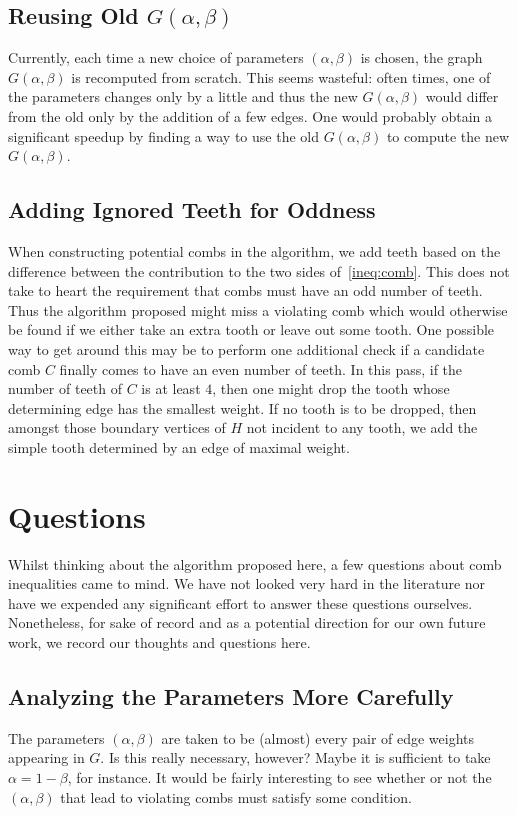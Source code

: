\documentclass[11pt, letterpaper]{amsart}
\theoremstyle{plain}
\theoremstyle{definition}
\theoremstyle{remark}
\begin{document}
\subsection{Reusing Old $G(\alpha,\beta)$}
Currently, each time a new choice of parameters $(\alpha,\beta)$ is chosen, the
graph $G(\alpha,\beta)$ is recomputed from scratch. This seems wasteful: often times,
one of the parameters changes only by a little and thus the new $G(\alpha,\beta)$
would differ from the old only by the addition of a few edges. One would probably
obtain a significant speedup by finding a way to use the old $G(\alpha,\beta)$
to compute the new $G(\alpha,\beta)$.

\subsection{Adding Ignored Teeth for Oddness}
When constructing potential combs in the algorithm, we add teeth based on the
difference between the contribution to the two sides of~\eqref{ineq:comb}. This
does not take to heart the requirement that combs must have an odd number of
teeth.  Thus the algorithm proposed might miss a violating comb which would
otherwise be found if we either take an extra tooth or leave out some tooth.
One possible way to get around this may be to perform one additional check if a
candidate comb $C$ finally comes to have an even number of teeth. In this pass,
if the number of teeth of $C$ is at least $4$, then one might drop the tooth
whose determining edge has the smallest weight. If no tooth is to be dropped,
then amongst those boundary vertices of $H$ not incident to any tooth, we add
the simple tooth determined by an edge of maximal weight.

\section{Questions}\label{sec:questions}
Whilst thinking about the algorithm proposed here, a few questions about comb
inequalities came to mind. We have not looked very hard in the literature nor
have we expended any significant effort to answer these questions ourselves.
Nonetheless, for sake of record and as a potential direction for our own future
work, we record our thoughts and questions here.

\subsection{Analyzing the Parameters More Carefully}
The parameters $(\alpha,\beta)$ are taken to be (almost) every pair of edge
weights appearing in $G$. Is this really necessary, however?  Maybe it is
sufficient to take $\alpha = 1 - \beta$, for instance. It would be fairly
interesting to see whether or not the $(\alpha,\beta)$ that lead to violating
combs must satisfy some condition.
\end{document}
